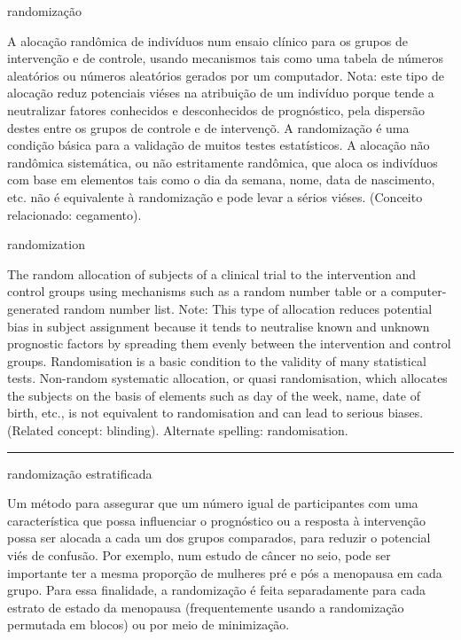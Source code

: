 \documentclass[
]{book}
\begin{document}
randomização

A alocação randômica de indivíduos num ensaio clínico para os grupos de intervenção e de controle, usando mecanismos tais como uma tabela de números aleatórios ou números aleatórios gerados por um computador. Nota: este tipo de alocação reduz potenciais viéses na atribuição de um indivíduo porque tende a neutralizar fatores conhecidos e desconhecidos de prognóstico, pela dispersão destes entre os grupos de controle e de intervençõ. A randomização é uma condição básica para a validação de muitos testes estatísticos. A alocação não randômica sistemática, ou não estritamente randômica, que aloca os indivíduos com base em elementos tais como o dia da semana, nome, data de nascimento, etc. não é equivalente à randomização e pode levar a sérios viéses. (Conceito relacionado: cegamento).

randomization

The random allocation of subjects of a clinical trial to the intervention and control groups using mechanisms such as a random number table or a computer-generated random number list. Note: This type of allocation reduces potential bias in subject assignment because it tends to neutralise known and unknown prognostic factors by spreading them evenly between the intervention and control groups. Randomisation is a basic condition to the validity of many statistical tests. Non-random systematic allocation, or quasi randomisation, which allocates the subjects on the basis of elements such as day of the week, name, date of birth, etc., is not equivalent to randomisation and can lead to serious biases. (Related concept: blinding). Alternate spelling: randomisation.

\begin{center}\rule{0.5\linewidth}{0.5pt}\end{center}

randomização estratificada

Um método para assegurar que um número igual de participantes com uma característica que possa influenciar o prognóstico ou a resposta à intervenção possa ser alocada a cada um dos grupos comparados, para reduzir o potencial viés de confusão. Por exemplo, num estudo de câncer no seio, pode ser importante ter a mesma proporção de mulheres pré e pós a menopausa em cada grupo. Para essa finalidade, a randomização é feita separadamente para cada estrato de estado da menopausa (frequentemente usando a randomização permutada em blocos) ou por meio de minimização.
\end{document}
